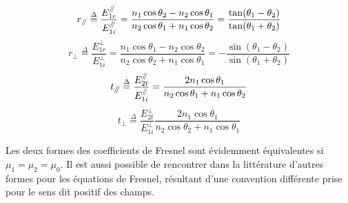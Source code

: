 
\[r_{\mathbin{/\mkern-5mu/}} \overset{\Delta}= \frac{E_{1r}^{\mathbin{/\mkern-5mu/}}}{E_{1i}^{\mathbin{/\mkern-5mu/}}} = \frac{n_{1}\cos \theta_{2} - n_{2} \cos \theta_{1} }{n_{2} \cos \theta_{1} + n_{1} \cos \theta_{2} } = \frac{\tan(\theta_{1}-\theta_{2})}{\tan(\theta_{1}+\theta_{2})}\]
\[r_{\perp} \overset{\Delta}= \frac{E_{1r}^{\perp}}{E_{1i}^{\perp}} = \frac{n_{1}\cos \theta_{1} - n_{2} \cos \theta_{2} }{n_{2} \cos \theta_{2} + n_{1} \cos \theta_{1}} = -\frac{\sin(\theta_{1} - \theta_{2})}{\sin(\theta_{1} + \theta_{2})} \]
\[t_{\mathbin{/\mkern-5mu/}} \overset{\Delta}= \frac{E_{2t}^{\mathbin{/\mkern-5mu/}}}{E_{1i}^{\mathbin{/\mkern-5mu/}}} = \frac{2 n_{1} \cos \theta_{1} }{n_{2} \cos \theta_{1} + n_{1} \cos \theta_{2}} \]
\[t_{\perp} \overset{\Delta}= \frac{E_{2t}^{\perp}}{E_{1i}^{\perp}} \frac{2 n_{1} \cos \theta_{1} }{n_{2} \cos \theta_{2} + n_{1} \cos \theta_{1}}\]


Les deux formes des coefficients de Fresnel sont évidemment équivalentes si $\mu_1 = \mu_2 = \mu_0$. Il est aussi possible de rencontrer dans la littérature d'autres formes pour les équations de Fresnel, résultant d'une convention différente prise pour le sens dit positif des champs. 
